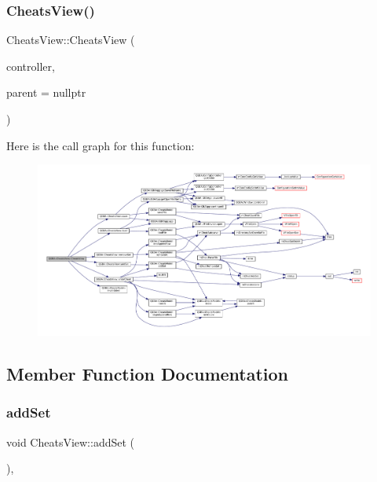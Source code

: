 \subsubsection{\texorpdfstring{Cheats\+View()}{CheatsView()}}
{\footnotesize\ttfamily Cheats\+View\+::\+Cheats\+View (\begin{DoxyParamCaption}\item[{std\+::shared\+\_\+ptr$<$ \mbox{\hyperlink{class_q_g_b_a_1_1_core_controller}{Core\+Controller}} $>$}]{controller,  }\item[{Q\+Widget $\ast$}]{parent = {\ttfamily nullptr} }\end{DoxyParamCaption})}

Here is the call graph for this function\+:
\nopagebreak
\begin{figure}[H]
\begin{center}
\leavevmode
\includegraphics[width=350pt]{class_q_g_b_a_1_1_cheats_view_a8e5acfbee04e60d9b7a7a44dacb33297_cgraph}
\end{center}
\end{figure}


\subsection{Member Function Documentation}
\mbox{\label{class_q_g_b_a_1_1_cheats_view_a37f11e62a7ad23c33635ad8c128db91d}} 
\subsubsection{\texorpdfstring{add\+Set}{addSet}}
{\footnotesize\ttfamily void Cheats\+View\+::add\+Set (\begin{DoxyParamCaption}{ }\end{DoxyParamCaption})\hspace{0.3cm}{\ttfamily [private]}, {\ttfamily [slot]}}

